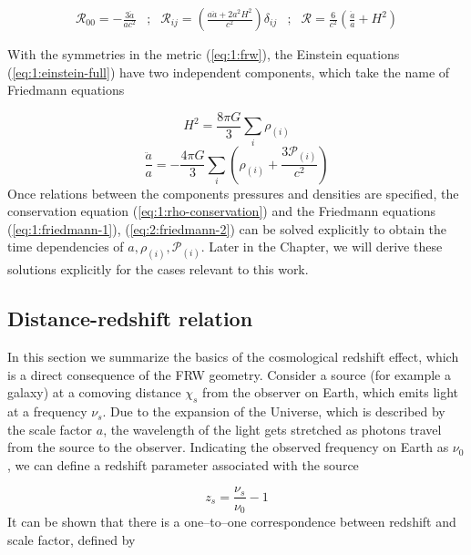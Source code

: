 \begin{equation}
\label{eq:1:ricci}
\begin{matrix}
\displaystyle \mathcal{R}_{00} = -\frac{3\ddot{a}}{ac^2} & ; & \displaystyle \mathcal{R}_{ij} = \left(\frac{a\ddot{a}+2a^2H^2}{c^2}\right)\delta_{ij} & ; & \displaystyle \mathcal{R} = \frac{6}{c^2}\left(\frac{\ddot{a}}{a}+H^2\right) \\ \\ 
\end{matrix}
\end{equation}
%
With the symmetries in the metric (\ref{eq:1:frw}), the Einstein equations (\ref{eq:1:einstein-full}) have two independent components, which take the name of Friedmann equations 

\begin{equation}
\label{eq:1:friedmann-1}
H^2 = \frac{8\pi G}{3}\sum_i\rho_{(i)}
\end{equation} 
%
\begin{equation}
\label{eq:2:friedmann-2}
\frac{\ddot{a}}{a} = -\frac{4\pi G}{3}\sum_i\left(\rho_{(i)}+\frac{3\mathcal{P}_{(i)}}{c^2}\right)
\end{equation}
%
Once relations between the components pressures and densities are specified, the conservation equation (\ref{eq:1:rho-conservation}) and the Friedmann equations (\ref{eq:1:friedmann-1}), (\ref{eq:2:friedmann-2}) can be solved explicitly to obtain the time dependencies of $a,\rho_{(i)},\mathcal{P}_{(i)}$. Later in the Chapter, we will derive these solutions explicitly for the cases relevant to this work.  

\subsection{Distance-redshift relation}
In this section we summarize the basics of the cosmological redshift effect, which is a direct consequence of the FRW geometry. Consider a source (for example a galaxy) at a comoving distance $\chi_s$ from the observer on Earth, which emits light at a frequency $\nu_s$. Due to the expansion of the Universe, which is described by the scale factor $a$, the wavelength of the light gets stretched as photons travel from the source to the observer. Indicating the observed frequency on Earth as $\nu_0$, we can define a redshift parameter associated with the source

\begin{equation}
\label{eq:1:redshift}
z_s = \frac{\nu_s}{\nu_0}-1
\end{equation}  
%
It can be shown that there is a one--to--one correspondence between redshift and scale factor, defined by

